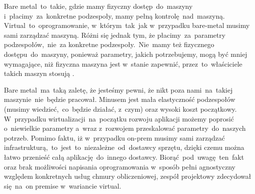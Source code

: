 \indent Bare metal~to~takie, gdzie mamy fizyczny dostęp~do~maszyny i~płacimy~za~konkretne podzespoły, mamy pełną kontrolę~nad~maszyną.
Virtual~to~oprogramowanie, w~którym~tak~jak w~przypadku bare-metal musimy sami zarządzać maszyną.
Różni się jednak tym, że płacimy~za~parametry podzespołów,~nie~za konkretne podzespoły.~Nie~mamy też fizycznego dostępu~do~maszyny, ponieważ parametry, jakich potrzebujemy, mogą być mniej wymagające, niż fizyczna maszyna jest w~stanie zapewnić, przez~to~właściciele takich maszyn stosują .

\indent Bare metal~ma~taką zaletę, że jesteśmy pewni, że nikt poza nami~na~takiej maszynie~nie~będzie pracował.
Minusem jest mała elastyczność podzespołów (musimy wiedzieć,~co~będzie działać, z~czym) oraz wysoki koszt początkowy.
W~przypadku wirtualizacji~na~początku rozwoju aplikacji możemy poprosić o~niewielkie parametry a~wraz z~rozwojem przeskalować parametry~do~naszych potrzeb.
Pomimo faktu, iż w~przypadku \gls{on-prem} musimy sami zarządzać infrastrukturą,~to~jest~to~niezależne~od~dostawcy sprzętu, dzięki czemu można łatwo przenieść całą aplikację~do~innego dostawcy.
Biorąć~pod~uwagę~ten~fakt oraz brak możliwości napisania oprogramowania w~sposób pełni agnostyczny względem konkretnych usług chmury obliczeniowej, zespół projektowy zdecydował się~na~on premise w~wariancie virtual.

